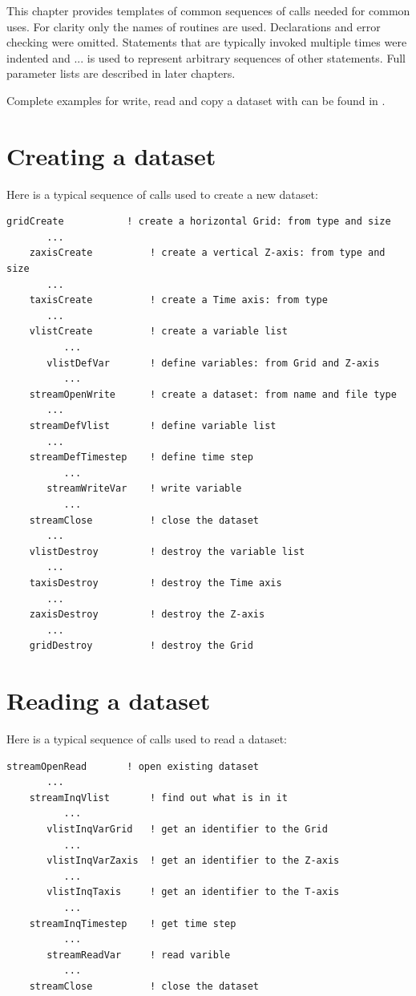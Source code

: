 This chapter provides templates of common sequences of {\CDI} calls needed for common uses.
For clarity only the names of routines are used. Declarations and error checking were omitted.
Statements that are typically invoked multiple times were indented and ... is used to 
represent arbitrary sequences of other statements. 
Full parameter lists are described in later chapters.

Complete examples for write, read and copy a dataset with {\CDI}
can be found in .

\section{Creating a dataset}

Here is a typical sequence of {\CDI} calls used to create a new dataset:

\begin{lstlisting}[backgroundcolor=\color{zebg}, basicstyle=\small]
    gridCreate           ! create a horizontal Grid: from type and size
       ...
    zaxisCreate          ! create a vertical Z-axis: from type and size
       ...
    taxisCreate          ! create a Time axis: from type
       ...
    vlistCreate          ! create a variable list
          ...
       vlistDefVar       ! define variables: from Grid and Z-axis
          ...
    streamOpenWrite      ! create a dataset: from name and file type
       ...
    streamDefVlist       ! define variable list
       ...
    streamDefTimestep    ! define time step
          ...   
       streamWriteVar    ! write variable
          ...
    streamClose          ! close the dataset
       ...
    vlistDestroy         ! destroy the variable list
       ...
    taxisDestroy         ! destroy the Time axis
       ...
    zaxisDestroy         ! destroy the Z-axis
       ...
    gridDestroy          ! destroy the Grid
\end{lstlisting}


\section{Reading a dataset}

Here is a typical sequence of {\CDI} calls used to read a dataset:

\begin{lstlisting}[backgroundcolor=\color{zebg}, basicstyle=\small]
    streamOpenRead       ! open existing dataset
       ...
    streamInqVlist       ! find out what is in it
          ...
       vlistInqVarGrid   ! get an identifier to the Grid
          ...
       vlistInqVarZaxis  ! get an identifier to the Z-axis
          ...
       vlistInqTaxis     ! get an identifier to the T-axis
          ...
    streamInqTimestep    ! get time step
          ...
       streamReadVar     ! read varible
          ...
    streamClose          ! close the dataset
\end{lstlisting}


